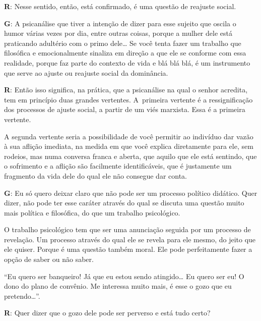  

\textbf{R}: Nesse sentido, então, está confirmado, é uma questão de
reajuste social.

 

\textbf{G}: A psicanálise que tiver a intenção de dizer para esse
sujeito que oscila o humor várias vezes por dia, entre outras coisas,
porque a mulher dele está praticando adultério com o primo dele…
Se você tenta fazer um trabalho que filosófica e emocionalmente sinaliza
em direção a que ele se conforme com essa realidade, porque faz parte do
contexto de vida e blá blá blá, é um instrumento que serve ao ajuste ou
reajuste social da dominância.

 

\textbf{R}: Então isso significa, na prática, que a psicanálise na qual o
senhor acredita, tem em princípio duas grandes vertentes. A~primeira
vertente é a ressignificação dos processos de ajuste social, a partir de
um viés marxista. Essa é a primeira vertente.

 

A segunda vertente seria a possibilidade de você permitir ao indivíduo
dar vazão à sua aflição imediata, na medida em que você explica
diretamente para ele, sem rodeios, mas numa conversa franca e aberta,
que aquilo que ele está sentindo, que o sofrimento e a aflição são
facilmente identificáveis, que é justamente um fragmento da vida dele do
qual ele não consegue dar conta.

 

\textbf{G}: Eu só quero deixar claro que não pode ser um processo
político didático. Quer dizer, não pode ter esse caráter através do qual
se discuta uma questão muito mais política e filosófica, do que um
trabalho psicológico.

 

O trabalho psicológico tem que ser uma anunciação seguida por um
processo de revelação. Um processo através do qual ele se revela para
ele mesmo, do jeito que ele quiser. Porque é uma questão também moral.
Ele pode perfeitamente fazer a opção de saber ou não saber.

 

``Eu quero ser banqueiro! Já que eu estou sendo atingido… Eu
quero ser eu! O dono do plano de convênio. Me interessa muito mais, é
esse o gozo que eu pretendo…''.

 

\textbf{R}: Quer dizer que o gozo dele pode ser perverso e está tudo
certo?

 

